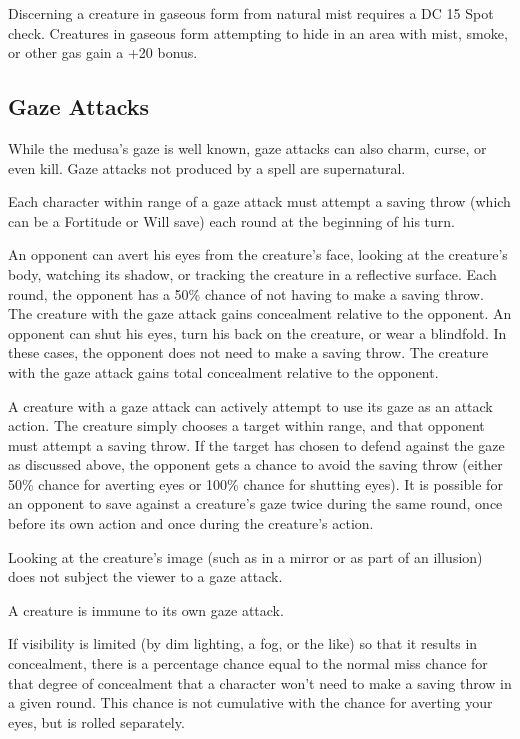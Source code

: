 Discerning a creature in gaseous form from natural mist requires a DC 15 Spot check. 
Creatures in gaseous form attempting to hide in an area with mist, smoke, or other 
gas gain a +20 bonus.

\subsection{Gaze Attacks}

While the medusa's gaze is well known, gaze attacks can also charm, curse, or even 
kill. Gaze attacks not produced by a spell are supernatural.

Each character within range of a gaze attack must attempt a saving throw (which 
can be a Fortitude or Will save) each round at the beginning of his turn.

An opponent can avert his eyes from the creature's face, looking at the creature's 
body, watching its shadow, or tracking the creature in a reflective surface. Each 
round, the opponent has a 50\% chance of not having to make a saving throw. The 
creature with the gaze attack gains concealment relative to the opponent. An opponent 
can shut his eyes, turn his back on the creature, or wear a blindfold. In these 
cases, the opponent does not need to make a saving throw. The creature with the 
gaze attack gains total concealment relative to the opponent.

A creature with a gaze attack can actively attempt to use its gaze as an attack 
action. The creature simply chooses a target within range, and that opponent must 
attempt a saving throw. If the target has chosen to defend against the gaze as 
discussed above, the opponent gets a chance to avoid the saving throw (either 50\% 
chance for averting eyes or 100\% chance for shutting eyes). It is possible for 
an opponent to save against a creature's gaze twice during the same round, once 
before its own action and once during the creature's action.

Looking at the creature's image (such as in a mirror or as part of an illusion) 
does not subject the viewer to a gaze attack.

A creature is immune to its own gaze attack.

If visibility is limited (by dim lighting, a fog, or the like) so that it results 
in concealment, there is a percentage chance equal to the normal miss chance for 
that degree of concealment that a character won't need to make a saving throw in 
a given round. This chance is not cumulative with the chance for averting your 
eyes, but is rolled separately.


